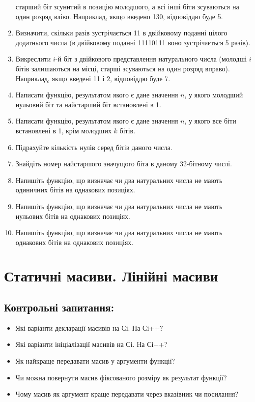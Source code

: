 \documentclass[a5paper,titlepage,openany,twoside,draft]{book_unv}%
\begin{document}
\begin{enumerate}
  старший біт зсунитий в позицію молодшого, а всі інші біти зсуваються
  на один розряд вліво. Наприклад, якщо введено 130, відповіддю буде 5.
\item
  Визначити, скільки разів зустрічається 11 в двійковому поданні цілого
  додатнього числа (в двійковому поданні 11110111 воно зустрічається 5
  разів).
\item
  Викреслити $i$-й біт з двійкового представлення натурального числа
  (молодші $i$ бітів залишаються на місці, старші зсуваються на один
  розряд вправо). Наприклад, якщо введені 11 і 2, відповіддю буде 7.
\item
  Написати функцію, результатом якого є дане значення $n$, у якого 
молодший нульовий біт та найстарший біт встановлені в 1.
\item
  Написати функцію, результатом якого є дане значення $n$, у якого все
  біти встановлені в 1, крім молодших $k$ бітів.
\item
  Підрахуйте кількість нулів серед бітів даного числа.
\item
  Знайдіть номер найстаршого значущого біта в даному 32-бітному числі.
\item
  Напишіть функцію, що визначає чи два натуральних числа не мають
  одиничних бітів на однакових позиціях.
\item
  Напишіть функцію, що визначає чи два натуральних числа не мають
  нульових бітів на однакових позиціях.
\item
  Напишіть функцію, що визначає чи два натуральних числа не мають
  однакових бітів на однакових позиціях.
\end{enumerate}


\chapter{ Статичні масиви. Лінійні масиви }
%

\section{Контрольні запитання:}
\begin{itemize}
\item
  Які варіанти декларації масивів на Сі. На Сі++?
\item
  Які варіанти ініціалізації масивів на Сі. На Сі++?
\item
  Як найкраще передавати масив у аргументи функції?
\item
  Чи можна повернути масив фіксованого розміру як результат функції?
\item
  Чому масив як аргумент краще передавати через вказівник чи посилання?

\end{itemize}
\end{document}
